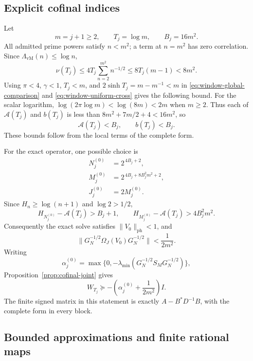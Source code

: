\subsection{Explicit cofinal indices}

Let
\[
 m=j+1\ge2,\qquad T_j=\log m,\qquad B_j=16m^2.
\]
All admitted prime powers satisfy $n<m^2$; a term at $n=m^2$
has zero correlation. Since $\Lambda_{\mathrm{vM}}(n)\le\log n$,
\[
 \nu(T_j)\le4T_j\sum_{n=2}^{m^2}n^{-1/2}
 \le8T_j(m-1)<8m^2.
\]
Using $\pi<4$, $\gamma<1$, $T_j<m$, and
$2\sinh T_j=m-m^{-1}<m$ in \eqref{eq:window-global-comparison} and
\eqref{eq:window-uniform-cross} gives the following bound.
For the scalar logarithm, $\log(2\pi\log m)<\log(8m)<2m$
when $m\ge2$.  Thus each of $\mathcal A(T_j)$ and $b(T_j)$
is less than $8m^2+7m/2+4<16m^2$, so
\begin{equation}\label{eq:cofinal-ab-bound}
 \mathcal A(T_j)<B_j,\qquad b(T_j)<B_j.
\end{equation}
These bounds follow from the local terms of the complete form.

For the exact operator, one possible choice is
\begin{align}
 N_j^{(0)}&=2^{\,4B_j+2},\\
 M_j^{(0)}&=2^{\,4B_j+8B_j^2m^2+2},\\
 J_j^{(0)}&=2M_j^{(0)}.
\end{align}
Since $H_n\ge\log(n+1)$ and $\log2>1/2$,
\[
 H_{N_j^{(0)}}-\mathcal A(T_j)>B_j+1,\qquad
 H_{M_j^{(0)}}-\mathcal A(T_j)>4B_j^2m^2.
\]
Consequently the exact solve satisfies
$\|V_0\|_{\mathrm{ph}}<1$, and
\[
 \|G_N^{-1/2}\Omega_J(V_0)G_N^{-1/2}\|
 <\frac1{2m^2}.
\]
Writing
\[
 \alpha_j^{(0)}=
 \max\{0,-\lambda_{\min}(G_N^{-1/2}S_MG_N^{-1/2})\},
\]
Proposition~\ref{prop:cofinal-joint} gives
\begin{equation}\label{eq:cofinal-exact-bound}
 W_{T_j}\succeq-\left(\alpha_j^{(0)}+\frac1{2m^2}\right)I.
\end{equation}
The finite signed matrix in this statement is exactly
$A-B^*D^{-1}B$, with the complete form in every block.

\subsection{Bounded approximations and finite rational maps}

